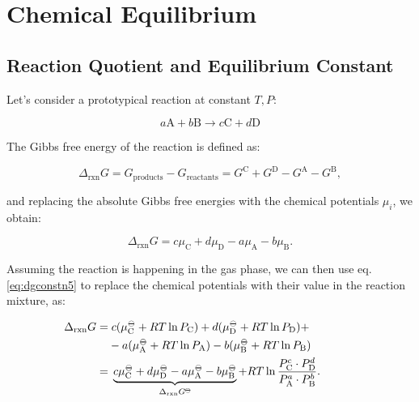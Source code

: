 \documentclass[
  9pt,
]{extbook}
\theoremstyle{definition}
\theoremstyle{definition}
\theoremstyle{definition}
\theoremstyle{remark}
\begin{document}
\renewcommand*{\standardstate}{{-\kern-6pt{\ominus}\kern-6pt-}}

\hypertarget{ChemicalEquilibrium}{%
\chapter{Chemical Equilibrium}\label{ChemicalEquilibrium}}

\hypertarget{reaction-quotient-and-equilibrium-constant}{%
\section{Reaction Quotient and Equilibrium Constant}\label{reaction-quotient-and-equilibrium-constant}}

Let's consider a prototypical reaction at constant \(T,P\):

\begin{equation}
 a\mathrm{A} + b\mathrm{B} \rightarrow c\mathrm{C} + d\mathrm{D} 
\label{eq:reaction4}
\end{equation}

The Gibbs free energy of the reaction is defined as:

\begin{equation}
\Delta_{\text{rxn}} G = G_{\text{products}} - G_{\text{reactants}} = G^{\text{C}} + G^{\text{D}} - G^{\text{A}}-G^{\text{B}},
\label{eq:chemeq1}
\end{equation}

and replacing the absolute Gibbs free energies with the chemical potentials \(\mu_i\), we obtain:

\begin{equation}
\Delta_{\text{rxn}} G = c \mu_{\text{C}} + d \mu_{\text{D}} - a \mu_{\text{A}}- b\mu_{\text{B}}.
\label{eq:chemeq2}
\end{equation}

Assuming the reaction is happening in the gas phase, we can then use eq. \eqref{eq:dgconstn5} to replace the chemical potentials with their value in the reaction mixture, as:

\begin{equation}
\begin{aligned}
\mkern-60mu \Delta_{\text{rxn}} G =& \; c (\mu_{\text{C}}^{-\kern-6pt{\ominus}\kern-6pt-}+RT \ln P_{\text{C}}) + d (\mu_{\text{D}}^{-\kern-6pt{\ominus}\kern-6pt-}+RT \ln P_{\text{D}}) +\\ & - a (\mu_{\text{A}}^{-\kern-6pt{\ominus}\kern-6pt-}+RT \ln P_{\text{A}}) - b (\mu_{\text{B}}^{-\kern-6pt{\ominus}\kern-6pt-}+RT \ln P_{\text{B}}) \\
  =& \; \underbrace{c \mu_{\text{C}}^{-\kern-6pt{\ominus}\kern-6pt-}+ d \mu_{\text{D}}^{-\kern-6pt{\ominus}\kern-6pt-}- a \mu_{\text{A}}^{-\kern-6pt{\ominus}\kern-6pt-}- b\mu_{\text{B}}^{-\kern-6pt{\ominus}\kern-6pt-}}_{\Delta_{\text{rxn}} G^{-\kern-6pt{\ominus}\kern-6pt-}}  +RT \ln \frac{P_{\text{C}}^c \cdot P_{\text{D}}^d}{P_{\text{A}}^a \cdot P_{\text{B}}^b}.
\end{aligned}
\label{eq:chemeq3}
\end{equation}
\end{document}
